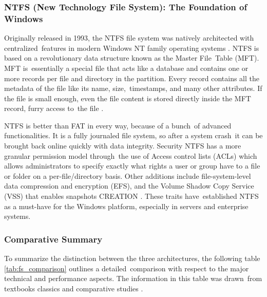 \documentclass[12pt]{article}
\begin{document}
\subsubsection{NTFS (New Technology File System): The Foundation of Windows}
Originally released in 1993, the NTFS file system was natively architected with centralized features in modern Windows NT family operating systems \parencite{Cunningham2024}. NTFS is based on a revolutionary data structure known as the Master File Table (MFT). MFT is essentially a special file that acts like a database and contains one or more records per file and directory in the partition. Every record contains all the metadata of the file like its name, size, timestamps, and many other attributes. If the file is small enough, even the file content is stored directly inside the MFT record, furry access to the file \parencite{Dhjaku2019, Silberschatz2018}. 

NTFS is better than FAT in every way, because of a bunch of advanced functionalities. It is a fully journaled file system, so after a system crash it can be brought back online quickly with data integrity. Security NTFS has a more granular permission model through the use of Access control lists (ACLs) which allows administrators to specify exactly what rights a user or group have to a file or folder on a per-file/directory basis. Other additions include file-system-level data compression and encryption (EFS), and the Volume Shadow Copy Service (VSS) that enables snapshots CREATION \parencite{Tanenbaum2014}. These traits have established NTFS as a must-have for the Windows platform, especially in servers and enterprise systems.

\subsubsection{Comparative Summary}
To summarize the distinction between the three architectures, the following table \ref{tab:fs_comparison} outlines a detailed comparison with respect to the major technical and performance aspects. The information in this table was drawn from textbooks classics and comparative studies \parencite{Dhjaku2019, Bundele2018}.

 
\end{document}
